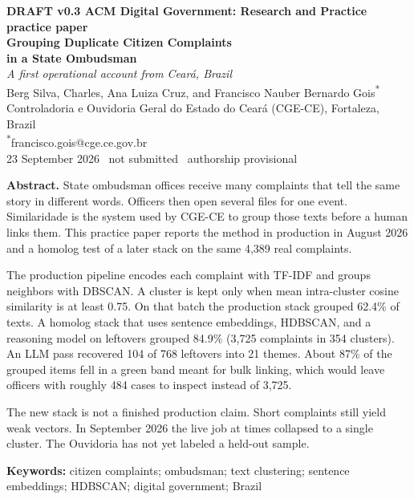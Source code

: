 \documentclass[11pt,a4paper]{article}
\begin{document}
\begin{center}
{\scriptsize\color{rulec}\textbf{DRAFT v0.3 \quad ACM Digital Government: Research and Practice \quad practice paper}}\\[0.7em]
{\LARGE\bfseries Grouping Duplicate Citizen Complaints\\[0.15em] in a State Ombudsman}\\[0.45em]
{\large\textit{A first operational account from Cear\'{a}, Brazil}}\\[0.9em]
Berg Silva, Charles, Ana Luiza Cruz, and Francisco Nauber Bernardo Gois\textsuperscript{*}\\[0.25em]
{\small Controladoria e Ouvidoria Geral do Estado do Cear\'{a} (CGE-CE), Fortaleza, Brazil}\\[0.15em]
{\small\textsuperscript{*}francisco.gois@cge.ce.gov.br}\\[0.7em]
{\small 23 September 2026 \textperiodcentered\ not submitted \textperiodcentered\ authorship provisional}
\end{center}

\vspace{0.4em}
\noindent\textbf{Abstract.}
State ombudsman offices receive many complaints that tell the same story in different words. Officers then open several files for one event. Similaridade is the system used by CGE-CE to group those texts before a human links them. This practice paper reports the method in production in August 2026 and a homolog test of a later stack on the same 4{,}389 real complaints.

The production pipeline encodes each complaint with TF-IDF and groups neighbors with DBSCAN. A cluster is kept only when mean intra-cluster cosine similarity is at least 0.75. On that batch the production stack grouped 62.4\% of texts. A homolog stack that uses sentence embeddings, HDBSCAN, and a reasoning model on leftovers grouped 84.9\% (3{,}725 complaints in 354 clusters). An LLM pass recovered 104 of 768 leftovers into 21 themes. About 87\% of the grouped items fell in a green band meant for bulk linking, which would leave officers with roughly 484 cases to inspect instead of 3{,}725.

The new stack is not a finished production claim. Short complaints still yield weak vectors. In September 2026 the live job at times collapsed to a single cluster. The Ouvidoria has not yet labeled a held-out sample.

\noindent\textbf{Keywords:} citizen complaints; ombudsman; text clustering; sentence embeddings; HDBSCAN; digital government; Brazil
\end{document}
